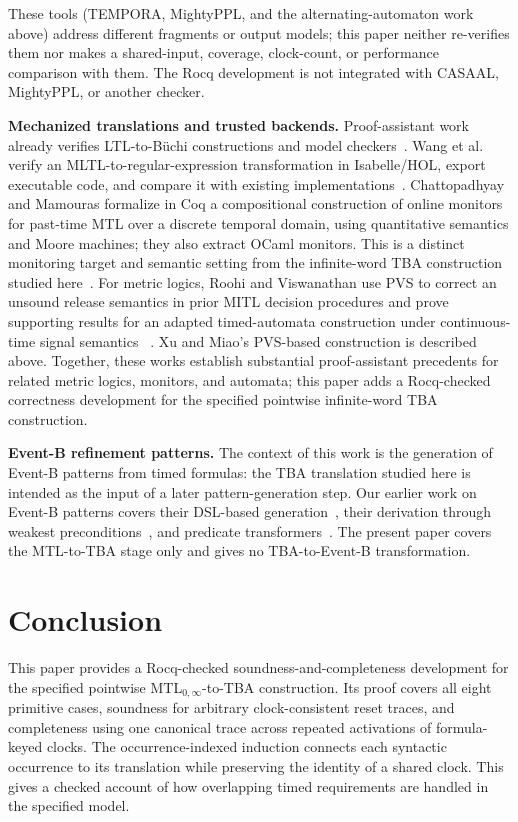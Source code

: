 \documentclass{ieeeaccess}
\newcommand{\runinhead}[1]{\par\noindent\textbf{#1}\enspace}
\begin{document}
These tools (TEMPORA, MightyPPL, and the alternating-automaton work above)
address different fragments or output models; this paper neither re-verifies
them nor makes a shared-input, coverage, clock-count, or performance
comparison with them. The Rocq development is not integrated with CASAAL,
MightyPPL, or another checker.

\runinhead{Mechanized translations and trusted backends.}
Proof-assistant work already verifies LTL-to-B\"uchi constructions and model
checkers~\cite{schimpf_tphols09,cava_cav13,ltl_to_gba_afp,
seidl_sickert_afp19}. Wang et al. verify an MLTL-to-regular-expression
transformation in Isabelle/HOL, export executable code, and compare it with
existing implementations~\cite{wang_mltl_tacas25}. Chattopadhyay and
Mamouras formalize in Coq a compositional construction of online monitors for
past-time MTL over a discrete temporal domain, using quantitative semantics
and Moore machines; they also extract OCaml monitors. This is a distinct
monitoring target and semantic setting from the infinite-word TBA construction
studied here~\cite{chattopadhyay_mamouras_rv20}. For metric logics, Roohi
and Viswanathan use PVS to correct an unsound release semantics in prior MITL
decision procedures and prove supporting results for an adapted
timed-automata construction under continuous-time signal semantics
~\cite{roohi_viswanathan_vmcai18}. Xu and Miao's PVS-based construction is
described above. Together, these works establish substantial proof-assistant
precedents for related metric logics, monitors, and automata; this paper adds a
Rocq-checked correctness development for the specified pointwise infinite-word
TBA construction.

\runinhead{Event-B refinement patterns.}
The context of this work is the generation of Event-B patterns from timed
formulas: the TBA translation studied here is intended as the input of a later
pattern-generation step. Our earlier work on Event-B patterns covers their
DSL-based generation~\cite{fares_abz23}, their derivation through weakest
preconditions~\cite{fares_facs24}, and predicate transformers~\cite{fares_scp27}.
The present paper covers the MTL-to-TBA stage only and gives no TBA-to-Event-B
transformation.

\section{Conclusion}
This paper provides a Rocq-checked soundness-and-completeness development for
the specified pointwise MTL$_{0,\infty}$-to-TBA construction. Its proof covers
all eight primitive cases, soundness for arbitrary
clock-consistent reset traces, and completeness using one canonical trace
across repeated activations of formula-keyed clocks. The occurrence-indexed
induction connects each syntactic occurrence to its translation while
preserving the identity of a shared clock. This gives a checked account of how
overlapping timed requirements are handled in the specified model.
\end{document}
